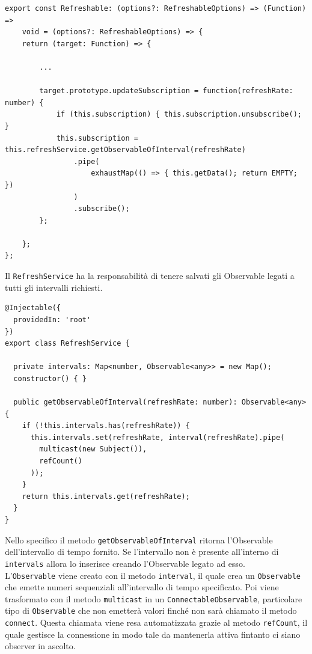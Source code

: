 \begin{lstlisting}[caption={Metodo updateSubscription all'interno del Refreshable decorator}, style=javaScriptCode]
export const Refreshable: (options?: RefreshableOptions) => (Function) => 
    void = (options?: RefreshableOptions) => {
    return (target: Function) => {
        
        ...

        target.prototype.updateSubscription = function(refreshRate: number) {
            if (this.subscription) { this.subscription.unsubscribe(); }
            this.subscription = this.refreshService.getObservableOfInterval(refreshRate)
                .pipe(
                    exhaustMap(() => { this.getData(); return EMPTY; })
                )
                .subscribe();
        };
        
    };
};
\end{lstlisting}
Il \verb|RefreshService| ha la responsabilità di tenere salvati gli Observable legati a tutti gli intervalli richiesti. \\
\begin{lstlisting}[caption={Classe RefreshService}, style=javaScriptCode]
@Injectable({
  providedIn: 'root'
})
export class RefreshService {

  private intervals: Map<number, Observable<any>> = new Map();
  constructor() { }

  public getObservableOfInterval(refreshRate: number): Observable<any> {
    if (!this.intervals.has(refreshRate)) {
      this.intervals.set(refreshRate, interval(refreshRate).pipe(
        multicast(new Subject()),
        refCount()
      ));
    }
    return this.intervals.get(refreshRate);
  }
}
\end{lstlisting}
Nello specifico il metodo \verb|getObservableOfInterval| ritorna l'Observable dell'intervallo di tempo fornito. Se l'intervallo non è presente all'interno di \verb|intervals| allora lo inserisce creando l'Observable legato ad esso.\\ L'\verb|Observable| viene creato con il metodo \verb|interval|, il quale crea un \verb|Observable| che emette numeri sequenziali all'intervallo di tempo specificato. Poi viene trasformato con il metodo \verb|multicast| in un \verb|ConnectableObservable|, particolare tipo di \verb|Observable| che non emetterà valori finché non sarà chiamato il metodo \verb|connect|. Questa chiamata viene resa automatizzata grazie al metodo \verb|refCount|, il quale gestisce la connessione in modo tale da mantenerla attiva fintanto ci siano observer in ascolto.\\

